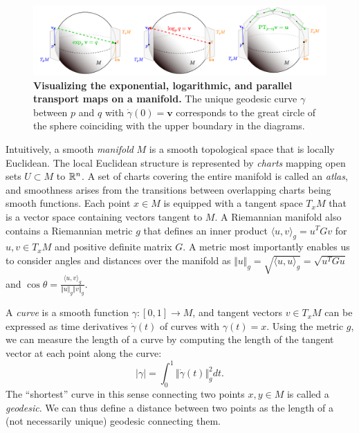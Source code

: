 \begin{figure}[t!]
    \includegraphics[width=\linewidth]{figures/manifolds.drawio.pdf}
    \caption{\label{fig:manifolds}\textbf{Visualizing the exponential, logarithmic, and parallel transport maps on a manifold.} The unique geodesic curve $\gamma$ between $p$ and $q$ with $\dot \gamma(0) = \mathbf{v}$ corresponds to the great circle of the sphere coinciding with the upper boundary in the diagrams.}    
\end{figure}

Intuitively, a smooth \textit{manifold} $M$ is a smooth topological space that is locally Euclidean. The local Euclidean structure is represented by \textit{charts} mapping open sets $U \subset M$ to $\mathbb{R}^n$. A set of charts covering the entire manifold is called an \textit{atlas}, and smoothness arises from the transitions between overlapping charts being smooth functions. Each point $x \in M$ is equipped with a tangent space $T_x M$ that is a vector space containing vectors tangent to $M$. A Riemannian manifold also contains a Riemannian metric $g$ that defines an inner product $\langle u, v \rangle_g = u^T G v$ for $u, v \in T_x M$ and positive definite matrix $G$. A metric most importantly enables us to consider angles and distances over the manifold as $\Vert u \Vert_g = \sqrt{\langle u, u\rangle_g} = \sqrt{u^T G u}$ and $\cos \theta = \frac{\langle u, v \rangle_g}{\Vert u \Vert_g \Vert v \Vert_g}$. 

A \textit{curve} is a smooth function $\gamma: [0, 1] \to M$, and tangent vectors $v \in T_x M$ can be expressed as time derivatives $\dot \gamma(t)$ of curves with $\gamma(t) = x$. Using the metric $g$, we can measure the length of a curve by computing the length of the tangent vector at each point along the curve:
\begin{equation}
    \vert \gamma \vert =
    \int_0^1 \Vert \dot \gamma (t) \Vert_g^2 dt.
\end{equation}
The ``shortest'' curve in this sense connecting two points $x,y\in M$ is called a \textit{geodesic}. We can thus define a distance between two points as the length of a (not necessarily unique) geodesic connecting them. 

